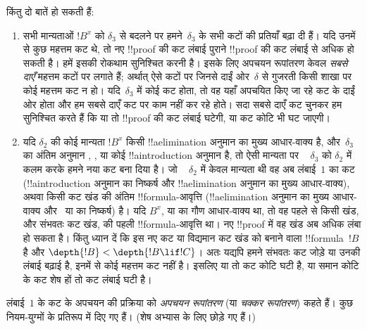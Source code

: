 \documentclass[../../../include/open-logic-section]{subfiles}
\begin{document}
किंतु दो बातें हो सकती हैं:
\begin{enumerate}
  \item सभी मान्यताओं $!B^x$ को $\delta_3$ से बदलने पर हमने~$\delta_3$ के
  सभी कटों की प्रतियाँ बढ़ा दी हैं। यदि उनमें से कुछ महत्तम कट थे, तो नए
  !!{proof} की कट लंबाई पुराने !!{proof} की कट लंबाई से अधिक हो सकती है। हमें
  इसकी रोकथाम सुनिश्चित करनी है। इसके लिए अपचयन रूपांतरण केवल \emph{सबसे
  दाएँ} महत्तम कटों पर लगाते हैं; अर्थात् ऐसे कटों पर जिनसे दाईं ओर~$\delta$
  से गुजरती किसी शाखा पर कोई महत्तम कट न हो। यदि~$\delta_3$ में कोई कट होता,
  तो वह यहाँ अपचयित किए जा रहे कट के दाईं ओर होता और हम सबसे दाएँ कट पर काम
  नहीं कर रहे होते। सदा सबसे दाएँ कट चुनकर हम सुनिश्चित करते हैं कि या तो
  !!{proof} की कट लंबाई घटेगी, या कट कोटि भी घट जाएगी।
  \item यदि $\delta_2$ की कोई मान्यता $!B^x$ किसी !!a{elimination} अनुमान का
  मुख्य आधार-वाक्य है, और~$\delta_3$ का अंतिम अनुमान \Elim{\lor},
  \Elim{\lexists}, या कोई !!a{introduction} अनुमान है, तो ऐसी मान्यता पर
  ~ $\delta_3$ को $\delta_2$ में कलम करके हमने नया कट बना दिया है। जो
  ~ $\delta_2$ में केवल मान्यता थी वह अब लंबाई~$1$ का कट
  (!!a{introduction} अनुमान का निष्कर्ष और !!a{elimination} अनुमान का मुख्य
  आधार-वाक्य), अथवा किसी कट खंड की अंतिम !!{formula}-आवृत्ति
  (!!a{elimination} अनुमान का मुख्य आधार-वाक्य और~\Elim{\lor} या
  \Elim{\lexists} का निष्कर्ष) है। यदि $B^x$, \Elim{\lor} या
  \Elim{\lexists} का गौण आधार-वाक्य था, तो वह पहले से किसी खंड, और संभवतः कट
  खंड, की पहली !!{formula}-आवृत्ति था। नए !!{proof} में वह खंड अब अधिक लंबा
  हो सकता है। किंतु ध्यान दें कि इस नए कट या विद्यमान कट खंड को बनाने वाला
  !!{formula}~$!B$ है और $\depth{!B} < \depth{!B \lif !C}$। अतः यद्यपि हमने
  संभवतः कट जोड़े या उनकी लंबाई बढ़ाई है, इनमें से कोई महत्तम कट नहीं है।
  इसलिए या तो कट कोटि घटी है, या समान कोटि के कट शेष हों तो कट लंबाई घटी है।
\end{enumerate}

लंबाई~$1$ के कट के अपचयन की प्रक्रिया को \emph{अपचयन रूपांतरण} (या
\emph{चक्कर रूपांतरण}) कहते हैं। कुछ नियम-युग्मों के प्रतिरूप
 में दिए गए हैं। (शेष अभ्यास के लिए छोड़े गए
हैं।)
\end{document}

